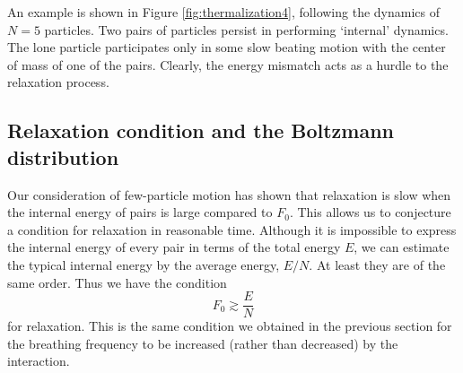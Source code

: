 \documentclass[a4paper, onecolumn]{revtex4-1}
\begin{document}
An example is shown in Figure \ref{fig:thermalization4}, following the dynamics of $N=5$ particles.
Two pairs of particles persist in performing `internal' dynamics.  The lone particle participates
only in some slow beating motion with the center of mass of one of the pairs.  Clearly, the energy
mismatch acts as a hurdle to the relaxation process.





\subsection{Relaxation condition and the Boltzmann distribution}

Our consideration of few-particle motion has shown that relaxation is slow when the internal energy
of pairs is large compared to $F_0$.  This allows us to conjecture a condition for relaxation in
reasonable time.  Although it is impossible to express the internal energy of every pair in terms of
the total energy $E$, we can estimate the typical internal energy by the average energy,
$E/N$. At least they are of the same order.  Thus we have the condition
\begin{equation}
F_0 \gtrsim \frac{E}{N}
\label{eq:thermalizatiton_condition}
\end{equation}
for relaxation.  This is the same condition we obtained in the previous section for the breathing
frequency to be increased (rather than decreased) by the interaction.
\end{document}
